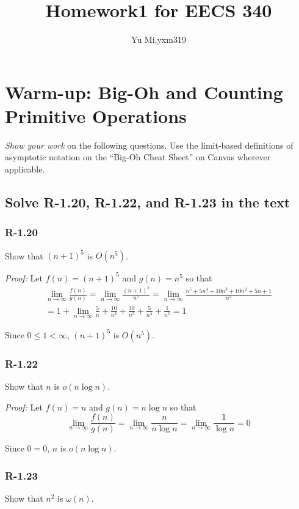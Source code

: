 \documentclass[11pt]{article}
\begin{document}
	\title{Homework1 for EECS 340}
	\author{Yu Mi,yxm319}
	\maketitle
\section{Warm-up: Big-Oh and Counting Primitive Operations}
\emph{Show your work} on the following questions. Use the limit-based definitions of asymptotic notation on the ``Big-Oh Cheat Sheet'' on Canvas wherever applicable.
\subsection{Solve R-1.20, R-1.22, and R-1.23 in the text}
\subsubsection{R-1.20}
	Show that $(n+1)^5$ is $O(n^5)$.

	\emph{Proof:} Let $f(n)=(n+1)^5$ and $g(n)=n^5$ so that
	\begin{equation*}
	\begin{multlined}
		\lim_{n\to\infty} \frac{f(n)}{g(n)}=\lim_{n\to\infty} \frac{(n+1)^5}{n^5}=\lim_{n\to\infty} \frac{n^5+5n^4+10n^3+10n^2+5n+1}{n^5}\\
		=1+\lim_{n\to\infty}\frac{5}{n}+\frac{10}{n^2}+\frac{10}{n^3}+\frac{5}{n^4}+\frac{1}{n^5}=1
	\end{multlined}
	\end{equation*}

	Since $0\leq1<\infty$, $(n+1)^5$ is $O(n^5)$.
\subsubsection{R-1.22}
	Show that $n$ is $o(n\log n)$.
	
	\emph{Proof:} Let $f(n)=n$ and $g(n)=n\log n$ so that
	\begin{equation*}
		\lim_{n\to\infty} \frac{f(n)}{g(n)}=\lim_{n\to\infty} \frac{n}{n\log n}=\lim_{n\to\infty} \frac{1}{\log n}=0
	\end{equation*}
	
	Since $0=0$, $n$ is $o(n\log n)$.
\subsubsection{R-1.23}
	Show that $n^2$ is $\omega(n)$.
	
\end{document}
